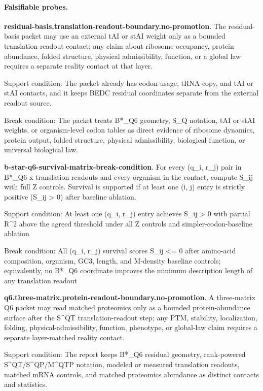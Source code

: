 \paragraph{Falsifiable probes.}
\textbf{residual-basis.translation-readout-boundary.no-promotion}. The residual-basis packet may use an external tAI or stAI weight only as a bounded translation-readout contact; any claim about ribosome occupancy, protein abundance, folded structure, physical admissibility, function, or a global law requires a separate reality contact at that layer.

Support condition: The packet already has codon-usage, tRNA-copy, and tAI or stAI contacts, and it keeps BEDC residual coordinates separate from the external readout source.

Break condition: The packet treats B*\_Q6 geometry, S\_Q notation, tAI or stAI weights, or organism-level codon tables as direct evidence of ribosome dynamics, protein output, folded structure, physical admissibility, biological function, or universal biological law.

\textbf{b-star-q6-survival-matrix-break-condition}. For every (q\_i, r\_j) pair in B*\_Q6 x translation readouts and every organism in the contact, compute S\_ij with full Z controls. Survival is supported if at least one (i, j) entry is strictly positive (S\_ij > 0) after baseline ablation.

Support condition: At least one (q\_i, r\_j) entry achieves S\_ij > 0 with partial R\textasciicircum{}2 above the agreed threshold under all Z controls and simpler-codon-baseline ablation

Break condition: All (q\_i, r\_j) survival scores S\_ij <= 0 after amino-acid composition, organism, GC3, length, and M-density baseline controls; equivalently, no B*\_Q6 coordinate improves the minimum description length of any translation readout

\textbf{q6.three-matrix.protein-readout-boundary.no-promotion}. A three-matrix Q6 packet may read matched proteomics only as a bounded protein-abundance surface after the S\textasciicircum{}QT translation-readout step; any PTM, stability, localization, folding, physical-admissibility, function, phenotype, or global-law claim requires a separate layer-matched reality contact.

Support condition: The report keeps B*\_Q6 residual geometry, rank-powered S\textasciicircum{}QT/S\textasciicircum{}QP/M\textasciicircum{}QTP notation, modeled or measured translation readouts, matched mRNA controls, and matched proteomics abundance as distinct contacts and statistics.

